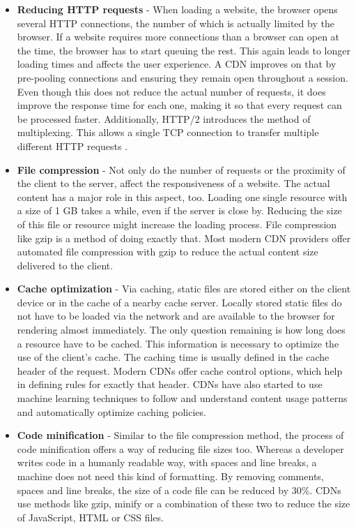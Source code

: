 \begin{itemize}
	\item \textbf{Reducing HTTP requests} - When loading a website, the browser opens several HTTP connections, the number of which is actually limited by the browser. If a website requires more connections than a browser can open at the time, the browser has to start queuing the rest. This again leads to longer loading times and affects the user experience. A CDN improves on that by pre-pooling connections and ensuring they remain open throughout a session. Even though this does not reduce the actual number of requests, it does improve the response time for each one, making it so that every request can be processed faster. Additionally, HTTP/2 introduces the method of multiplexing. This allows a single TCP connection to transfer multiple different HTTP requests \cite{http2}.
	
	\item \textbf{File compression} - Not only do the number of requests or the proximity of the client to the server, affect the responsiveness of a website. The actual content has a major role in this aspect, too. Loading one single resource with a size of 1 GB takes a while, even if the server is close by. Reducing the size of this file or resource might increase the loading process. File compression like gzip is a method of doing exactly that. Most modern CDN providers offer automated file compression with gzip to reduce the actual content size delivered to the client.
	
	\item \textbf{Cache optimization} - Via caching, static files are stored either on the client device or in the cache of a nearby cache server. Locally stored static files do not have to be loaded via the network and are available to the browser for rendering almost immediately. The only question remaining is how long does a resource have to be cached. This information is necessary to optimize the use of the client's cache. The caching time is usually defined in the cache header of the request. Modern CDNs offer cache control options, which help in defining rules for exactly that header.
	CDNs have also started to use machine learning techniques to follow and understand content usage patterns and automatically optimize caching policies.
	 
	\item \textbf{Code minification} - Similar to the file compression method, the process of code minification offers a way of reducing file sizes too. Whereas a developer writes code in a humanly readable way, with spaces and line breaks, a machine does not need this kind of formatting. By removing comments, spaces and line breaks, the size of a code file can be reduced by 30\%. CDNs use methods like gzip, minify or a combination of these two to reduce the size of JavaScript, HTML or CSS files.
	

\end{itemize}
